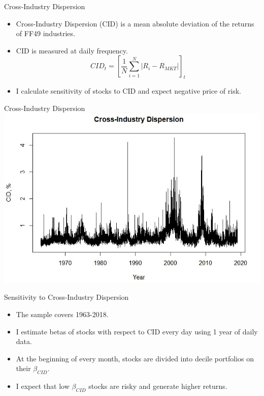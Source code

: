 \documentclass{beamer}
\begin{document}
\begin{frame}{Cross-Industry Dispersion}
\begin{itemize}
    \item {Cross-Industry Dispersion (CID) is a mean absolute deviation of the returns of FF49 industries.}
    \item {CID is measured at daily frequency.}
    $$CID_t = [\frac{1}{N}\sum^{N}_{i=1}{|R_i-R_{MKT}|}]_t$$
    \item {I calculate sensitivity of stocks to CID and expect negative price of risk.}
\end{itemize}
\end{frame}


\begin{frame}{Cross-Industry Dispersion}
\includegraphics[width=1\textwidth]{ts_cid_00.jpeg}
\end{frame}


\begin{frame}{Sensitivity to Cross-Industry Dispersion}
\begin{itemize}
    \item {The sample covers 1963-2018.}
    \item {I estimate betas of stocks with respect to CID every day using 1 year of daily data.}
    \item {At the beginning of every month, stocks are divided into decile portfolios on their $\beta_{CID}$.}
    \item {I expect that low $\beta_{CID}$ stocks are risky and generate higher returns.}
    
\end{itemize}

\end{frame}
\end{document}
